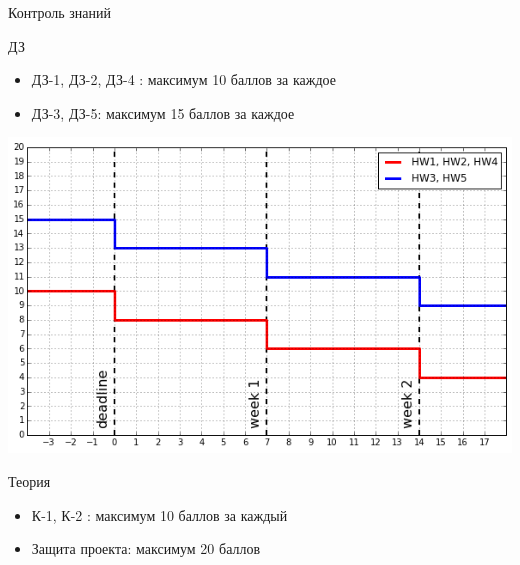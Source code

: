 \documentclass[aspectratio=169]{beamer}
\begin{document}
\begin{frame}{Контроль знаний}

\begin{block}{ДЗ}
\begin{itemize}
\item ДЗ-1, ДЗ-2, ДЗ-4 : максимум 10 баллов за каждое
\item ДЗ-3, ДЗ-5: максимум 15 баллов за каждое
\end{itemize}
\end{block}

\begin{center}
\includegraphics[scale=0.2]{images/hw.png}
\end{center}

\begin{alertblock}{Теория}
\begin{itemize}
\item К-1, К-2 : максимум 10 баллов за каждый
\item Защита проекта: максимум 20 баллов
\end{itemize}
\end{alertblock}

\end{frame}
\end{document}
